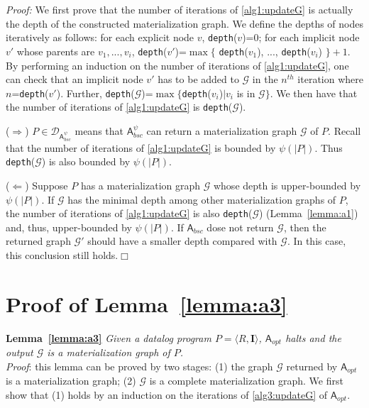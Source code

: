\noindent\emph{Proof:} We first prove that the number of iterations of \ref{alg1:updateG}
is actually the depth of the constructed materialization graph.
We define the depths of nodes iteratively as follows:
for each explicit node $v$, \texttt{depth}($v$)=0;
for each implicit node $v'$ whose parents are $v_1,...,v_i$, \texttt{depth}($v'$)=$\max$$\{$ \texttt{depth}($v_1$), ..., \texttt{depth}($v_i$) $\}+1$.
By performing an induction on the number of iterations of \ref{alg1:updateG},
one can check that an implicit node $v'$ has to be added to $\mathcal{G}$ in the $n^{th}$ iteration
where $n$=\texttt{depth}($v'$).
Further, \texttt{depth}($\mathcal{G}$)=$\max$$\{$\texttt{depth}($v_i$)$|v_i$ is in $\mathcal{G}\}$.
We then have that the number of iterations of \ref{alg1:updateG} is \texttt{depth}($\mathcal{G}$).

($\Rightarrow$) $P\in\mathcal{D}_{\mathsf{A}_{bsc}^{\psi}}$ means that $\mathsf{A}_{bsc}^{\psi}$ can return
a materialization graph $\mathcal{G}$ of $P$.
Recall that the number of iterations of \ref{alg1:updateG} is bounded by $\psi(|P|)$.
Thus \texttt{depth}($\mathcal{G}$) is also bounded by $\psi(|P|)$.

($\Leftarrow$) Suppose $P$ has a materialization graph $\mathcal{G}$ whose depth
is upper-bounded by $\psi(|P|)$.
If $\mathcal{G}$ has the minimal depth among other materialization graphs of $P$,
the number of iterations of \ref{alg1:updateG} is also \texttt{depth}($\mathcal{G}$) (Lemma~\ref{lemma:a1})
and, thus, upper-bounded by $\psi(|P|)$.
If $\mathsf{A}_{bsc}$ dose not return $\mathcal{G}$, then the returned graph $\mathcal{G}'$
should have a smaller depth compared with $\mathcal{G}$.
In this case, this conclusion still holds.\hfill$\Box$

\section{Proof of Lemma~\ref{lemma:a3}}

\textbf{Lemma~\ref{lemma:a3}}
\emph{Given a datalog program $P=\langle R, \textbf{I}\rangle$,
$\mathsf{A}_{opt}$ halts and the output $\mathcal{G}$ is a materialization graph of $P$.}\\

\noindent\emph{Proof}: this lemma can be proved by two stages:
(1) the graph $\mathcal{G}$ returned by $\mathsf{A}_{opt}$ is a materialization graph;
(2) $\mathcal{G}$ is a complete materialization graph.
We first show that (1) holds by an induction on the iterations of \ref{alg3:updateG} of $\mathsf{A}_{opt}$.

